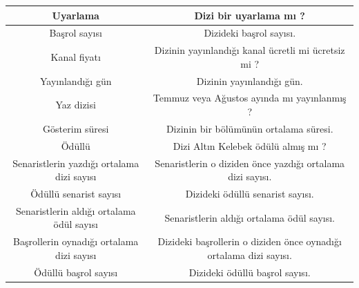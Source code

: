 \begin{table}[h]
{{{\begin{tabular}{|c|c|}
Uyarlama                                               & Dizi bir uyarlama mı ?                                                                                                  \\ \hline
Başrol sayısı                                          & Dizideki başrol sayısı.                                                                                                 \\ \hline
Kanal fiyatı                                           & Dizinin yayınlandığı kanal ücretli mi ücretsiz mi ?                                                                     \\ \hline
Yayınlandığı gün                                       & Dizinin yayınlandığı gün.                                                                                               \\ \hline
Yaz dizisi                                             & Temmuz veya Ağustos ayında mı yayınlanmış ?                                                                             \\ \hline
Gösterim süresi                                        & Dizinin bir bölümünün ortalama süresi.                                                                                  \\ \hline
Ödüllü                                                 & Dizi Altın Kelebek ödülü almış mı ?                                                                                     \\ \hline
Senaristlerin yazdığı ortalama dizi sayısı             & Senaristlerin o diziden önce yazdığı ortalama dizi sayısı.                                                              \\ \hline
Ödüllü senarist sayısı                                 & Dizideki ödüllü senarist sayısı.                                                                                        \\ \hline
Senaristlerin aldığı ortalama ödül sayısı              & Senaristlerin aldığı ortalama ödül sayısı.                                                                              \\ \hline
Başrollerin oynadığı ortalama dizi sayısı              & Dizideki başrollerin o diziden önce oynadığı ortalama dizi sayısı.                                                      \\ \hline
Ödüllü başrol sayısı                                   & Dizideki ödüllü başrol sayısı.                                                                                          \\ \hline

\end{tabular}}}}
\end{table}
